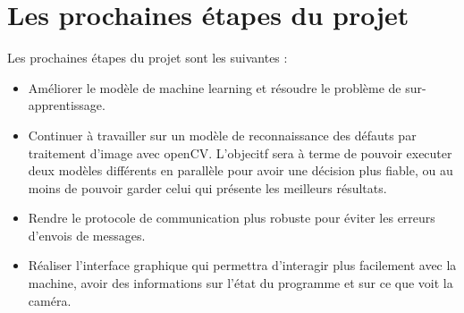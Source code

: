 \documentclass{article}
\begin{document}
\section{Les prochaines étapes du projet}
Les prochaines étapes du projet sont les suivantes :
\begin{itemize}
	\item Améliorer le modèle de machine learning et résoudre le problème de sur-apprentissage.
	\item Continuer à travailler sur un modèle de reconnaissance des défauts par traitement d'image avec openCV. L'objecitf sera à terme de pouvoir executer deux modèles différents en parallèle pour avoir une décision plus fiable, ou au moins de pouvoir garder celui qui présente les meilleurs résultats.
	\item Rendre le protocole de communication plus robuste pour éviter les erreurs d'envois de messages.
	\item Réaliser l'interface graphique qui permettra d'interagir plus facilement avec la machine, avoir des informations sur l'état du programme et sur ce que voit la caméra.
\end{itemize}


\end{document}
